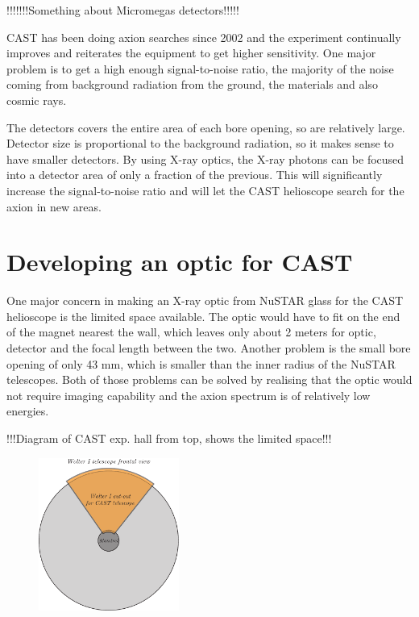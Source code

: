 !!!!!!!Something about Micromegas detectors!!!!!

CAST has been doing axion searches since 2002 and the experiment continually improves and reiterates the equipment to get higher sensitivity. One major problem is to get a high enough signal-to-noise ratio, the majority of the noise coming from background radiation from the ground, the materials and also cosmic rays.

The detectors covers the entire area of each bore opening, so are relatively large. Detector size is proportional to the background radiation, so it makes sense to have smaller detectors. By using X-ray optics, the X-ray photons can be focused into a detector area of only a fraction of the previous. This will significantly increase the signal-to-noise ratio and will let the CAST helioscope search for the axion in new areas.

\section{Developing an optic for CAST}
One major concern in making an X-ray optic from NuSTAR glass for the CAST helioscope is the limited space available. The optic would have to fit on the end of the magnet nearest the wall, which leaves only about 2 meters for optic, detector and the focal length between the two. Another problem is the small bore opening of only 43 mm, which is smaller than the inner radius of the NuSTAR telescopes. Both of those problems can be solved by realising that the optic would not require imaging capability and the axion spectrum is of relatively low energies.

!!!Diagram of CAST exp. hall from top, shows the limited space!!!

\begin{figure}[htbp]
  \centering
    \includegraphics[height=5cm]{figures/cast/wolter1-cutout.pdf}
  \caption{}
  \label{fig:wolter1-cutout}
\end{figure}

